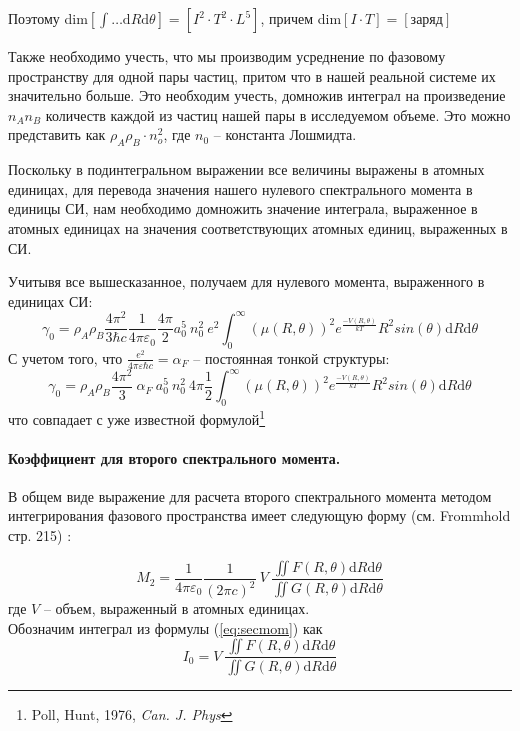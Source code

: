 Поэтому dim\([\int \ldots \mathrm{d}R\mathrm{d}\theta]=[I^2\cdot T^2\cdot L^5]\), причем dim\([I\cdot T]=[\text{заряд}]\)\newline

Также необходимо учесть, что мы производим усреднение по фазовому пространству для одной пары частиц, притом что в нашей реальной системе их значительно больше. Это необходим учесть, домножив интеграл на произведение $n_An_B$ количеств каждой из частиц нашей пары в исследуемом объеме. Это можно представить как $\rho_A\rho_B\cdot n_o^2$, где $n_0$ -- константа Лошмидта.
\par
Поскольку в подинтегральном выражении все величины выражены в атомных единицах, для перевода значения нашего нулевого спектрального момента в единицы СИ, нам необходимо домножить значение интеграла, выраженное в атомных единицах на значения соответствующих атомных единиц, выраженных в СИ.
\par
Учитывя все вышесказанное, получаем для нулевого момента, выраженного в единицах СИ:
\begin{displaymath}
\gamma_0=\rho_A\rho_B \frac{4\pi^2}{3\hbar c} \frac{1}{4\pi\varepsilon_0}\frac{4\pi}{2}a_0^5\:n_0^2\:e^2\int^{\infty}_0(\mu(R,\theta))^2e^{\frac{-V(R,\theta)}{kT}}R^2sin(\theta)\mathrm{d}R\mathrm{d} \theta
\end{displaymath}
С учетом того, что \( \frac{e^2}{4\pi\varepsilon\hbar c}=\alpha_F\) -- постоянная тонкой структуры:
\begin{equation}
\gamma_0=\rho_A\rho_B \frac{4\pi^2}{3}\: \alpha_F \: a_0^5\:n_0^2\:4\pi\frac{1}{2}\int^{\infty}_0(\mu(R,\theta))^2e^{\frac{-V(R,\theta)}{kT}}R^2sin(\theta)\mathrm{d}R\mathrm{d} \theta
\end{equation}
что совпадает с уже известной формулой\footnote{Poll, Hunt, 1976, \textit{Can. J. Phys}}

\paragraph{Коэффициент для второго спектрального момента.}

В общем виде выражение для расчета второго спектрального момента методом интегрирования фазового пространства имеет следующую форму ({см. Frommhold стр. 215}) :

\begin{equation}
\label{eq:secmom}
M_2=\frac{1}{4\pi\varepsilon_0}\frac{1}{(2\pi c)^2}\:V\:\frac{\iint {F}(R,\theta)\mathrm{d}R\mathrm{d} \theta}{\iint  {G}(R,\theta)\mathrm{d}R\mathrm{d} \theta}
\end{equation}
где $V$ -- объем, выраженный в атомных единицах.\\
Обозначим интеграл из формулы (\ref{eq:secmom}) как
\begin{displaymath}
I_0=V \:\frac{\iint {F}(R,\theta)\mathrm{d}R\mathrm{d} \theta}{\iint  {G}(R,\theta)\mathrm{d}R\mathrm{d} \theta}
\end{displaymath}

